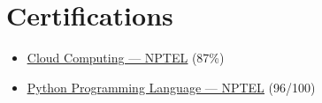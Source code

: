 \documentclass[letterpaper,10.5pt]{article}
\begin{document}
\vspace{-2pt}

\section{Certifications}
\vspace{2pt}
\begin{itemize}[leftmargin=0.18in, label={$\bullet$}, itemsep=1pt]
  \small
  \item \href{https://drive.google.com/file/d/1EgNRVsyfF4c0dhOu0ZpxeTqFXBzJtF91/view}{\color{navy}\underline{Cloud Computing — NPTEL}} (87\%)
  \item \href{https://drive.google.com/file/d/1eI4_2EjFB4-ncL_SLh_iVtlrlwEGnf9-/view}{\color{navy}\underline{Python Programming Language — NPTEL}} (96/100)
\end{itemize}
\end{document}
